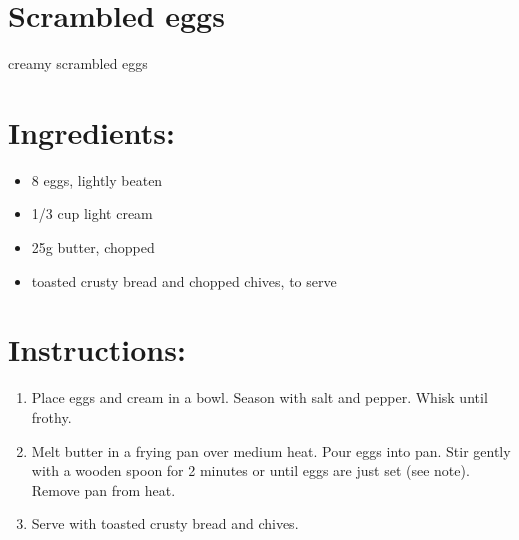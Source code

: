 \section{Scrambled eggs}
creamy scrambled eggs
\section{Ingredients:}
\begin{itemize}
\item 8 eggs, lightly beaten
\item 1/3 cup light cream
\item 25g butter, chopped
\item toasted crusty bread and chopped chives, to serve
\end{itemize}

\section{Instructions:}
\begin{enumerate}

\item Place eggs and cream in a bowl. Season with salt and pepper. Whisk until frothy.
\item Melt butter in a frying pan over medium heat. Pour eggs into pan. Stir gently with a wooden spoon for 2 minutes or until eggs are just set (see note). Remove pan from heat.
\item Serve with toasted crusty bread and chives.

\end{enumerate}
